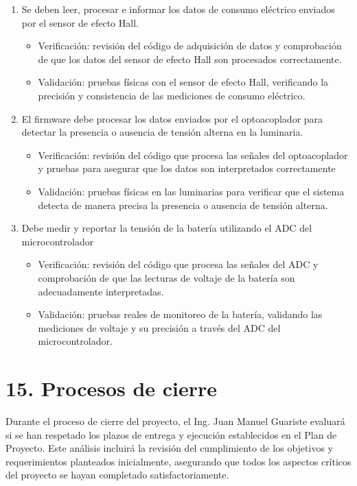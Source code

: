 \documentclass[
11pt, %
]{charter}
\begin{document}
\begin{enumerate}
\begin{enumerate}
\begin{itemize}
				\end{itemize}
			\item Se deben leer, procesar e informar los datos de consumo eléctrico enviados por el sensor de efecto Hall.
				\begin{itemize}
				\item Verificación: revisión del código de adquisición de datos y comprobación de que los datos del sensor de efecto Hall son procesados correctamente.
				\item Validación: pruebas físicas con el sensor de efecto Hall, verificando la precisión y consistencia de las mediciones de consumo eléctrico.
				\end{itemize}
			\item El firmware debe procesar los datos enviados por el optoacoplador para detectar la presencia o ausencia de tensión alterna en la luminaria.
				\begin{itemize}
				\item Verificación: revisión del código que procesa las señales del optoacoplador y pruebas para asegurar que los datos son interpretados correctamente
				\item Validación: pruebas físicas en las luminarias para verificar que el sistema detecta de manera precisa la presencia o ausencia de tensión alterna.
				\end{itemize}
			\item Debe medir y reportar la tensión de la batería utilizando el ADC del microcontrolador
				\begin{itemize}
				\item Verificación: revisión del código que procesa las señales del ADC y comprobación de que las lecturas de voltaje de la batería son adecuadamente 	interpretadas.
				\item Validación: pruebas reales de monitoreo de la batería, validando las mediciones de voltaje y su precisión a través del ADC del microcontrolador.
				\end{itemize}
		\end{enumerate}
\end{enumerate}

\section{15. Procesos de cierre}    
\label{sec:cierre}

Durante el proceso de cierre del proyecto, el Ing. Juan Manuel Guariste evaluará si se han respetado los plazos de entrega y ejecución establecidos en el Plan de Proyecto. Este análisis incluirá la revisión del cumplimiento de los objetivos y requerimientos planteados inicialmente, asegurando que todos los aspectos críticos del proyecto se hayan completado satisfactoriamente.
\end{document}
